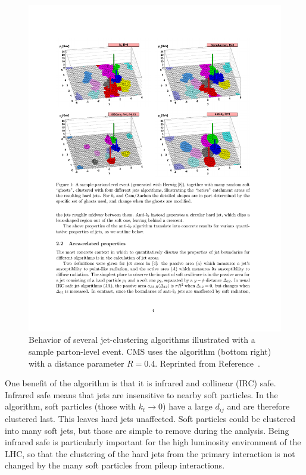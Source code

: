  \begin{figure}[h!]
	\centering
	\includegraphics[width=\linewidth]{Figures/EventReconstruction/jetAlgorithms.pdf}
       \caption{Behavior of several jet-clustering algorithms illustrated with a sample parton-level event. 
       CMS uses the \antikt algorithm (bottom right) with a distance parameter $R = 0.4$.
       Reprinted from Reference~\cite{antikt}.}
       \label{fig:jetAlgorithms}
\end{figure}
 
One benefit of the \antikt algorithm is that it is infrared and collinear (IRC) safe. Infrared safe means that \antikt jets are insensitive to nearby soft particles. In the \antikt algorithm, soft particles (those with $k_t \rightarrow 0$) have a large $d_{ij}$ and are therefore clustered last. This leaves hard jets unaffected. Soft particles could be clustered into many soft jets, but those are simple to remove during the analysis. Being infrared safe is particularly important for the high luminosity environment of the LHC, so that the clustering of the hard jets from the primary interaction is not changed by the many soft particles from pileup interactions.

